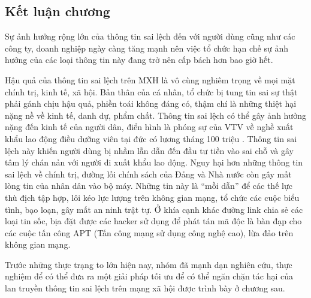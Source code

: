 	\subsection*{Kết luận chương}
	Sự ảnh hưởng rộng lớn của thông tin sai lệch đến với người dùng cũng như các công ty, doanh nghiệp ngày càng tăng mạnh nên việc tổ chức hạn chế sự ảnh hưởng của các loại thông tin này đang trở nên cấp bách hơn bao giờ hết. 
	
	Hậu quả của thông tin sai lệch trên MXH là vô cùng nghiêm trọng về mọi mặt chính trị, kinh tế, xã hội. Bản thân của cá nhân, tổ chức bị tung tin sai sự thật phải gánh chịu hậu quả, phiền toái không đáng có, thậm chí là những thiệt hại nặng nề về kinh tế, danh dự, phẩm chất. Thông tin sai lệch có thể gây ảnh hưởng nặng đến kinh tế của người dân, điển hình là phóng sự của VTV về nghề xuất khẩu lao động điều dưỡng viên tại đức có lương tháng 100 triệu \cite{dieuduong}. Thông tin sai lệch này khiến người dùng bị nhầm lẫn dẫn đến đầu tư tiền vào sai chỗ và gây tâm lý chán nản với người đi xuất khẩu lao động. Nguy hại hơn những thông tin sai lệch về chính trị, đường lối chính sách của Đảng và Nhà nước còn gây mất lòng tin của nhân dân vào bộ máy. Những tin này là “mồi dẫn” để các thế lực thù địch tập hợp, lôi kéo lực lượng trên không gian mạng, tổ chức các cuộc biểu tình, bạo loạn, gây mất an ninh trật tự. Ở khía cạnh khác đường link chia sẻ các loại tin sốc, bịa đặt được các hacker sử dụng để phát tán mã độc là bàn đạp cho các cuộc tấn công APT (Tấn công mạng sử dụng công nghệ cao), lừa đảo trên không gian mạng.
	
	Trước những thực trạng to lớn hiện nay, nhóm đã mạnh dạn nghiên cứu, thực nghiệm để có thể đưa ra một giải pháp tối ưu để có thể ngăn chặn tác hại của lan truyền thông tin sai lệch trên mạng xã hội được trình bày ở chương sau.
			